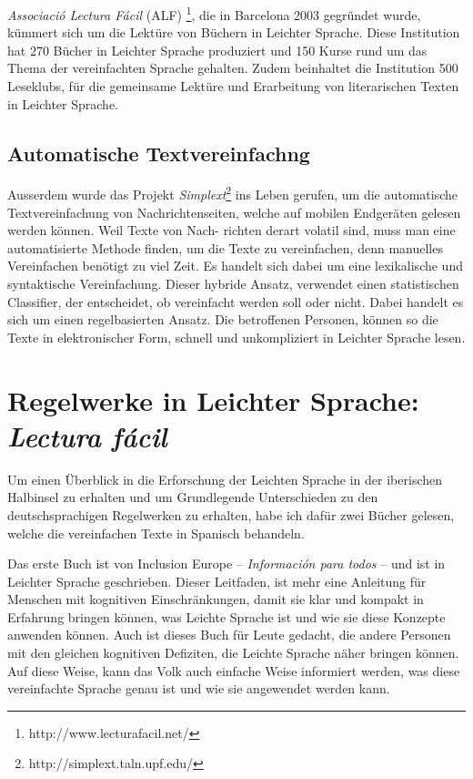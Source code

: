 \documentclass[11pt]{article}
\begin{document}
\textit{Associació Lectura Fácil} (ALF) \footnote{http://www.lecturafacil.net/}, die in Barcelona 2003 gegründet wurde, kümmert sich um die Lektüre von Büchern in Leichter Sprache. Diese Institution hat 270 Bücher in Leichter Sprache produziert und 150 Kurse rund um das Thema der vereinfachten Sprache gehalten. Zudem beinhaltet die Institution 500 Leseklubs, für die gemeinsame Lektüre und Erarbeitung von literarischen Texten in Leichter Sprache.

\subsection{Automatische Textvereinfachng }
Ausserdem wurde das Projekt \textit{Simplext}\footnote{http://simplext.taln.upf.edu/} ins Leben gerufen, um die automatische Textvereinfachung von Nachrichtenseiten, welche auf mobilen Endgeräten gelesen werden können. Weil Texte von Nach- richten derart volatil sind, muss man eine automatisierte Methode finden, um die Texte zu vereinfachen, denn manuelles Vereinfachen benötigt zu viel Zeit. Es handelt sich dabei um eine lexikalische und syntaktische Vereinfachung. Dieser hybride Ansatz, verwendet einen statistischen Classifier, der entscheidet, ob vereinfacht werden soll oder nicht. Dabei handelt es sich um einen regelbasierten Ansatz. Die betroffenen Personen, können so die Texte in elektronischer Form, schnell und unkompliziert in Leichter Sprache lesen. 

\section{Regelwerke in Leichter Sprache: \textit{Lectura fácil}}
Um einen Überblick in die Erforschung der Leichten Sprache in der iberischen Halbinsel zu erhalten und um Grundlegende Unterschieden zu den deutschsprachigen Regelwerken zu erhalten, habe ich dafür zwei Bücher gelesen, welche die vereinfachen Texte in Spanisch behandeln.

Das erste Buch ist von Inclusion Europe -- \textit{Información para todos} \cite{europe2010informacion} -- und ist in Leichter Sprache geschrieben. Dieser Leitfaden, ist mehr eine Anleitung für Menschen mit kognitiven Einschränkungen, damit sie klar und kompakt in Erfahrung bringen können, was Leichte Sprache ist und wie sie diese Konzepte anwenden können. Auch ist dieses Buch für Leute gedacht, die andere Personen mit den gleichen kognitiven Defiziten, die Leichte Sprache näher bringen können. Auf diese Weise, kann das Volk auch einfache Weise informiert werden, was diese vereinfachte Sprache genau ist und wie sie angewendet werden kann. 
\end{document}
